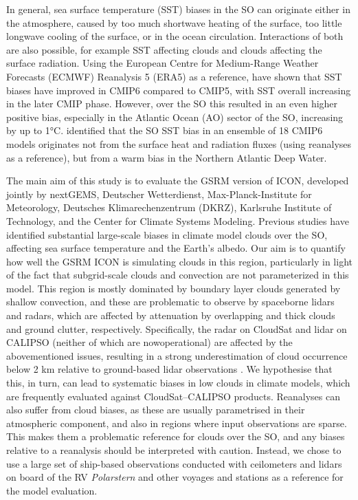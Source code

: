 \documentclass[12pt,a4paper]{article}
\begin{document}
In general, sea surface temperature (SST) biases in the SO can originate either
in the atmosphere, caused by too much shortwave heating of the surface, too
little longwave cooling of the surface, or in the ocean circulation.
Interactions of both are also possible, for example SST affecting clouds and
clouds affecting the surface radiation. Using the European
Centre for Medium-Range Weather Forecasts (ECMWF) Reanalysis 5 (ERA5) as a reference, \cite{zhang2023} have shown that SST
biases have improved in CMIP6 compared to CMIP5, with SST
overall increasing in the later CMIP phase. However, over the SO this resulted
in an even higher positive bias, especially in the Atlantic Ocean (AO) sector
of the SO, increasing by up to 1°C.  \cite{luo2023} identified that the SO SST
bias in an ensemble of 18 CMIP6 models originates not from the surface heat and
radiation fluxes (using reanalyses as a reference), but from a warm bias in the
Northern Atlantic Deep Water.

The main aim of this study is to evaluate the GSRM version of ICON, developed
jointly by nextGEMS, Deutscher Wetterdienst, Max-Planck-Institute for
Meteorology, Deutsches Klimarechenzentrum (DKRZ), Karlsruhe Institute of
Technology, and the Center for Climate Systems Modeling.  Previous studies have
identified substantial large-scale biases in climate model clouds over the SO,
affecting sea surface temperature and the Earth’s albedo. Our aim is to
quantify how well the GSRM ICON is simulating clouds in this region,
particularly in light of the fact that subgrid-scale clouds and convection are
not parameterized in this model. This region is mostly dominated by boundary
layer clouds generated by shallow convection, and these are problematic to
observe by spaceborne lidars and radars, which are affected by attenuation by
overlapping and thick clouds and ground clutter, respectively.  Specifically,
the radar on CloudSat and lidar on CALIPSO (neither of which are nowoperational) are affected by the abovementioned issues, resulting in a strong
underestimation of cloud occurrence below 2 km relative to ground-based lidar
observations \citep{mcerlich2021}.  We hypothesise that this, in turn, can lead to systematic
biases in low clouds in climate models, which are frequently evaluated against
CloudSat--CALIPSO products. Reanalyses can also suffer from cloud biases, as
these are usually parametrised in their atmospheric component, and also in
regions where input observations are sparse.  This makes them a problematic
reference for clouds over the SO, and any biases relative to a reanalysis
should be interpreted with caution. Instead, we chose to use a large set of
ship-based observations conducted with ceilometers and lidars on board of the
RV \emph{Polarstern} and other voyages and stations as a reference for the
model evaluation.
\end{document}
